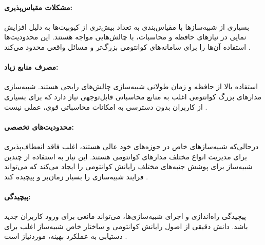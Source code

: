 \paragraph{مشکلات مقیاس‌پذیری:}
بسیاری از شبیه‌سازها با مقیاس‌بندی به تعداد بیش‌تری از کیوبیت‌ها به دلیل افزایش نمایی در نیازهای حافظه و محاسبات، با چالش‌هایی مواجه هستند. این محدودیت‌ها استفاده آن‌ها را برای سامانه‌های کوانتومی بزرگ‌تر و مسائل واقعی محدود می‌کند \cite{xu_herculean_2023}.

\paragraph{مصرف منابع زیاد:}
استفاده بالا از حافظه و زمان طولانی شبیه‌سازی چالش‌های رایجی هستند. شبیه‌سازی مدارهای بزرگ کوانتومی اغلب به منابع محاسباتی قابل‌توجهی نیاز دارد که برای بسیاری از کاربران بدون دسترسی به امکانات محاسباتی قوی، عملی نیست \cite{young_simulating_2023}.

\paragraph{محدودیت‌های تخصصی:}
درحالی‌که شبیه‌سازهای خاص در حوزه‌های خود عالی هستند، اغلب فاقد انعطاف‌پذیری برای مدیریت انواع مختلف مدارهای کوانتومی هستند. این نیاز به استفاده از چندین شبیه‌ساز برای پوشش جنبه‌های مختلف رایانش کوانتومی را ایجاد می‌کند که می‌تواند فرایند شبیه‌سازی را بسیار زمان‌بر و پیچیده کند \cite{jamadagni_benchmarking_2024}.

\paragraph{پیچیدگی:}
پیچیدگی راه‌اندازی و اجرای شبیه‌سازی‌ها، می‌تواند مانعی برای ورود کاربران جدید باشد. دانش دقیقی از اصول رایانش کوانتومی و ساختار خاص شبیه‌ساز اغلب برای دستیابی به عملکرد بهینه، موردنیاز است \cite{jamadagni_benchmarking_2024}.
